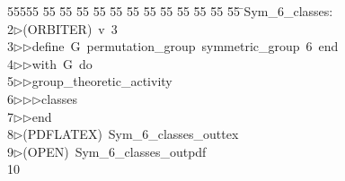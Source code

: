 %
%
\begin{tabbing}
55555 \= 55 \= 55 \= 55 \= 55 \= 55 \= 55 \= 55 \= 55 \= 55 \= 55 \= 55 \= 55 \= \>Sym\_6\_classes:\\[0pt]
2\>$\triangleright$\>(ORBITER)\ v\ 3\ \\[0pt]
3\>$\triangleright$\>$\triangleright$\>define\ G\ permutation\_group\ symmetric\_group\ 6\ end\ \\[0pt]
4\>$\triangleright$\>$\triangleright$\>with\ G\ do\ \\[0pt]
5\>$\triangleright$\>$\triangleright$\>group\_theoretic\_activity\ \\[0pt]
6\>$\triangleright$\>$\triangleright$\>$\triangleright$\>classes\ \\[0pt]
7\>$\triangleright$\>$\triangleright$\>end\\[0pt]
8\>$\triangleright$\>(PDFLATEX)\ Sym\_6\_classes\_outtex\\[0pt]
9\>$\triangleright$\>(OPEN)\ Sym\_6\_classes\_outpdf\\[0pt]
10\>\end{tabbing}
